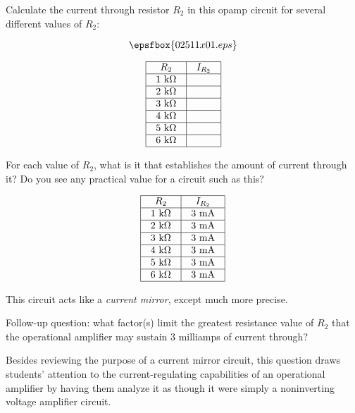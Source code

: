 

Calculate the current through resistor $R_2$ in this opamp circuit for several different values of $R_2$:

$$\epsfbox{02511x01.eps}$$


$$\vbox{\offinterlineskip
\halign{\strut
\vrule \quad\hfil # \ \hfil & 
\vrule \quad\hfil # \ \hfil \vrule \cr
\noalign{\hrule}
%
$R_2$ & $I_{R_2}$ \cr
%
\noalign{\hrule}
%
1 k$\Omega$ &    \cr
%
\noalign{\hrule}
%
2 k$\Omega$ &    \cr
%
\noalign{\hrule}
%
3 k$\Omega$ &    \cr
%
\noalign{\hrule}
%
4 k$\Omega$ &    \cr
%
\noalign{\hrule}
%
5 k$\Omega$ &    \cr
%
\noalign{\hrule}
%
6 k$\Omega$ &    \cr
%
\noalign{\hrule}
} %
}$$ %

For each value of $R_2$, what is it that establishes the amount of current through it?  Do you see any practical value for a circuit such as this?







$$\vbox{\offinterlineskip
\halign{\strut
\vrule \quad\hfil # \ \hfil & 
\vrule \quad\hfil # \ \hfil \vrule \cr
\noalign{\hrule}
%
$R_2$ & $I_{R_2}$ \cr
%
\noalign{\hrule}
%
1 k$\Omega$ & 3 mA \cr
%
\noalign{\hrule}
%
2 k$\Omega$ & 3 mA \cr
%
\noalign{\hrule}
%
3 k$\Omega$ & 3 mA \cr
%
\noalign{\hrule}
%
4 k$\Omega$ & 3 mA \cr
%
\noalign{\hrule}
%
5 k$\Omega$ & 3 mA \cr
%
\noalign{\hrule}
%
6 k$\Omega$ & 3 mA \cr
%
\noalign{\hrule}
} %
}$$ %

This circuit acts like a {\it current mirror}, except much more precise.

\vskip 10pt

Follow-up question: what factor(s) limit the greatest resistance value of $R_2$ that the operational amplifier may sustain 3 milliamps of current through?







Besides reviewing the purpose of a current mirror circuit, this question draws students' attention to the current-regulating capabilities of an operational amplifier by having them analyze it as though it were simply a noninverting voltage amplifier circuit.




